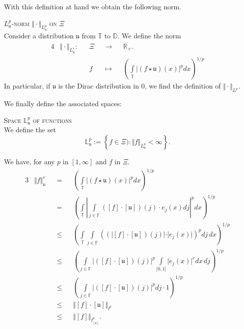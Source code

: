 \begin{Liste}[]
With this definition at hand we obtain the following norm.

\begin{de}{\textsc{$L^{p}_{\mathfrak{u}}$-norm $\Vert \cdot \Vert_{L^{p}_{\mathfrak{u}}}$ on $\Xi$}\\}\label{DE_INTRO_FREQ_LPUXI}
Consider a distribution $\mathfrak{u}$ from $\mathds{T}$ to $\mathds{D}$.
We define the norm
\begin{alignat*}{4}
& \Vert \cdot \Vert_{L^{r}_{\mathfrak{u}}} : && \Xi && \rightarrow && \overline{\mathds{R}_{+}}.\\
& && f && \mapsto && \left(\int\limits_{\mathds{T}} \vert (f \star \mathfrak{u})(x)\vert^{p} dx\right)^{1/p}
\end{alignat*}
In particular, if $\mathfrak{u}$ is the Dirac distribution in $0$, we find the definition of $\Vert \cdot \Vert_{L^{p}}$.
\end{de}

We finally define the associated spaces:
\begin{de}{\textsc{Space $\mathds{L}_{\mathfrak{u}}^{p}$ of functions}\\}\label{DE_INTRO_FREQ_SPACELPUXI}
We define the set
\[\mathds{L}_{\mathfrak{u}}^{p} := \left\{f \in \Xi) : \Vert f \Vert_{L_{\mathfrak{u}}^{p}} < \infty \right\}.\]
\end{de}

We have, for any $p$ in $[1 ,\infty]$ and $f$ in $\Xi$.
\begin{alignat*}{3}
&\Vert f \Vert^{r}_{\mathfrak{u}} &&=&& \left(\int\limits_{\mathds{T}} \vert (f\star\mathfrak{u})(x)\vert^{p} dx\right)^{1/p}\\
& &&=&& \left(\int\limits_{\mathds{T}} \left\vert \int\limits_{j \in \mathds{F}}([f]\cdot [\mathfrak{u}])(j) \cdot e_{j}(x) dj\right\vert^{p} dx\right)^{1/p}\\
& &&\leq&& \left(\int\limits_{\mathds{T}} \int\limits_{j \in \mathds{F}}\left((\vert[f]\cdot [\mathfrak{u}])(j)\vert \cdot \vert e_{j}(x)\vert\right)^{p} dj \, dx\right)^{1/p}\\
& &&\leq&& \left(\int\limits_{j \in \mathds{F}}\vert ([f]\cdot[\mathfrak{u}])(j)\vert^{p}\int\limits_{[0, 1[} \vert e_{j}(x)\vert^{r} dx \, dj\right)^{1/p}\\
& &&\leq&& \left(\int\limits_{j \in \mathds{F}}\vert ([f] \cdot [\mathfrak{u}])(j)\vert^{p} dj \cdot 1\right)^{1/p}\\
& &&\leq&& \Vert[f]\cdot [\mathfrak{u}]\Vert_{l^{p}}\\
& &&\leq&& \Vert[f]\Vert_{l^{p}_{[\mathfrak{u}]}}.
\end{alignat*}


\end{Liste}
